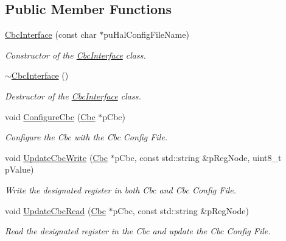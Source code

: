 \subsection*{Public Member Functions}
\begin{DoxyCompactItemize}
\item 
\hyperlink{class_ph2___hw_interface_1_1_cbc_interface_a3ddefe5549da06a7d26fee1502a792b4}{Cbc\-Interface} (const char $\ast$pu\-Hal\-Config\-File\-Name)
\begin{DoxyCompactList}\small\item\em Constructor of the \hyperlink{class_ph2___hw_interface_1_1_cbc_interface}{Cbc\-Interface} class. \end{DoxyCompactList}\item 
\hyperlink{class_ph2___hw_interface_1_1_cbc_interface_a1f0ab7d7cf7783a0fe275e8e1d7e5a49}{$\sim$\-Cbc\-Interface} ()
\begin{DoxyCompactList}\small\item\em Destructor of the \hyperlink{class_ph2___hw_interface_1_1_cbc_interface}{Cbc\-Interface} class. \end{DoxyCompactList}\item 
void \hyperlink{class_ph2___hw_interface_1_1_cbc_interface_a0567c7a31f70f446202e60d037c869ea}{Configure\-Cbc} (\hyperlink{class_ph2___hw_description_1_1_cbc}{Cbc} $\ast$p\-Cbc)
\begin{DoxyCompactList}\small\item\em Configure the Cbc with the Cbc Config File. \end{DoxyCompactList}\item 
void \hyperlink{class_ph2___hw_interface_1_1_cbc_interface_aa4daecdb7c91b835dee7520b9e6664f9}{Update\-Cbc\-Write} (\hyperlink{class_ph2___hw_description_1_1_cbc}{Cbc} $\ast$p\-Cbc, const std\-::string \&p\-Reg\-Node, uint8\-\_\-t p\-Value)
\begin{DoxyCompactList}\small\item\em Write the designated register in both Cbc and Cbc Config File. \end{DoxyCompactList}\item 
void \hyperlink{class_ph2___hw_interface_1_1_cbc_interface_a6f9082c399255d69036e97f2ede63754}{Update\-Cbc\-Read} (\hyperlink{class_ph2___hw_description_1_1_cbc}{Cbc} $\ast$p\-Cbc, const std\-::string \&p\-Reg\-Node)
\begin{DoxyCompactList}\small\item\em Read the designated register in the Cbc and update the Cbc Config File. \end{DoxyCompactList}\item 

\end{DoxyCompactItemize}
